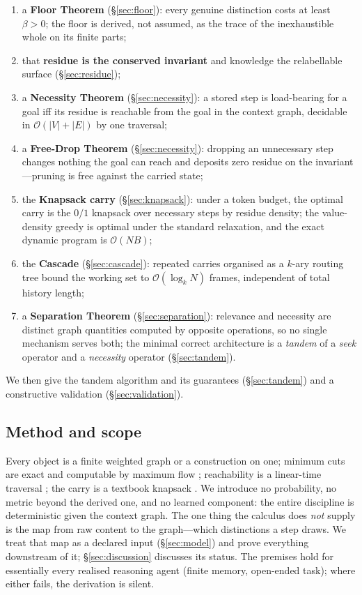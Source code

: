 \documentclass[11pt,twocolumn,a4paper]{article}
\theoremstyle{thmstyle}
\theoremstyle{definition}
\theoremstyle{remark}
\newcommand{\Vrt}{V}
\newcommand{\Edg}{E}
\newcommand{\flo}{\beta}                %
\newcommand{\budget}{B}
\newcommand{\abs}[1]{\lvert#1\rvert}
\begin{document}
\begin{enumerate}[leftmargin=1.6em,itemsep=2pt]
\item a \textbf{Floor Theorem} (\S\ref{sec:floor}): every genuine distinction
costs at least $\flo>0$; the floor is derived, not assumed, as the trace of the
inexhaustible whole on its finite parts;
\item that \textbf{residue is the conserved invariant} and knowledge the
relabellable surface (\S\ref{sec:residue});
\item a \textbf{Necessity Theorem} (\S\ref{sec:necessity}): a stored step is
load-bearing for a goal iff its residue is reachable from the goal in the
context graph, decidable in $\mathcal{O}(\abs\Vrt+\abs\Edg)$ by one traversal;
\item a \textbf{Free-Drop Theorem} (\S\ref{sec:necessity}): dropping an
unnecessary step changes nothing the goal can reach and deposits zero residue on
the invariant---pruning is free against the carried state;
\item the \textbf{Knapsack carry} (\S\ref{sec:knapsack}): under a token budget,
the optimal carry is the $0/1$ knapsack over necessary steps by residue density;
the value-density greedy is optimal under the standard relaxation, and the exact
dynamic program is $\mathcal{O}(N\budget)$;
\item the \textbf{Cascade} (\S\ref{sec:cascade}): repeated carries organised as a
$k$-ary routing tree bound the working set to $\mathcal{O}(\log_k N)$ frames,
independent of total history length;
\item a \textbf{Separation Theorem} (\S\ref{sec:separation}): relevance and
necessity are distinct graph quantities computed by opposite operations, so no
single mechanism serves both; the minimal correct architecture is a
\emph{tandem} of a \emph{seek} operator and a \emph{necessity} operator
(\S\ref{sec:tandem}).
\end{enumerate}

We then give the tandem algorithm and its guarantees (\S\ref{sec:tandem}) and a
constructive validation (\S\ref{sec:validation}).

\subsection{Method and scope}

Every object is a finite weighted graph or a construction on one; minimum cuts
are exact and computable by maximum flow \citep{fordfulkerson1956,menger1927};
reachability is a linear-time traversal \citep{tarjan1972}; the carry is a
textbook knapsack \citep{dantzig1957,kellerer2004}. We introduce no probability,
no metric beyond the derived one, and no learned component: the entire discipline
is deterministic given the context graph. The one thing the calculus does
\emph{not} supply is the map from raw content to the graph---which distinctions a
step draws. We treat that map as a declared input (\S\ref{sec:model}) and prove
everything downstream of it; \S\ref{sec:discussion} discusses its status. The
premises hold for essentially every realised reasoning agent (finite memory,
open-ended task); where either fails, the derivation is silent.
\end{document}
